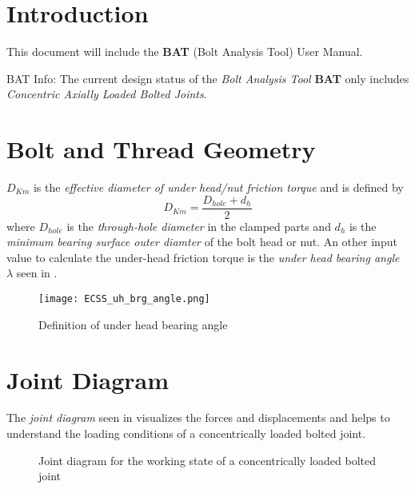 \chapter{Introduction}
This document will include the \textbf{BAT} (Bolt Analysis Tool) User Manual.
\begin{colbox}{BAT Info:}
  The current design status of the \emph{Bolt Analysis Tool} \textbf{BAT} only includes 
  \emph{Concentric Axially Loaded Bolted Joints}. 
\end{colbox}

\chapter{Bolt and Thread Geometry}
$D_{Km}$ is the \emph{effective diameter of under head/nut friction torque} and is defined by 
\begin{equation}
  D_{Km} = \frac{D_{hole}+d_h}{2}
  \label{equ:dkm}
\end{equation}
where $D_{hole}$ is the \emph{through-hole diameter} in the clamped parts and $d_h$ is the 
\emph{minimum bearing surface outer diamter} of the bolt head or nut. An other input value to calculate
the under-head friction torque  is the \emph{under head bearing angle} $\lambda$ seen in 
.
\begin{figure}[!htpb]
  \centering
  \texttt{[image: ECSS\_uh\_brg\_angle.png]}
  \caption{Definition of under head bearing angle \cite{ECSS_HB_32_23A}}
  \label{fig:ecss_uh_brg_angle}
\end{figure}

\chapter{Joint Diagram}
\label{ch:jointdiag}
The \emph{joint diagram} seen in  \cite{VDI2230_1} visualizes the forces and 
displacements and helps to understand the loading conditions of a concentrically loaded bolted joint. 
\begin{figure}[!htbp]
  \centering
  \caption{Joint diagram for the working state of a concentrically loaded bolted joint}
\end{figure}

